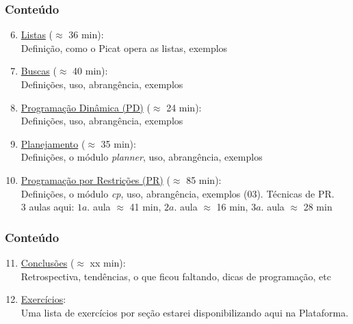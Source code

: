 			
\begin{frame}[fragile]
  \frametitle{Conteúdo}
  
  \begin{enumerate}

   \setcounter{enumi}{5}
    \item  \underline{Listas} ($\approx$ 36 min):\\
    Definição, como o Picat opera as listas, exemplos


    \pause
    \item  \underline{Buscas} ($\approx$ 40 min):\\
    Definições, uso, abrangência, exemplos

    \pause
    \item \underline{Programação Dinâmica (PD)} ($\approx$ 24 min):\\
        Definições, uso, abrangência, exemplos

    
    \pause
    \item \underline{Planejamento} ($\approx$ 35 min):\\
        Definições, o módulo \textit{planner}, uso, abrangência, exemplos

    \pause
		\item \underline{Programação por Restrições (PR)} ($\approx$ 85 min):\\
      Definições, o módulo \textit{cp}, uso, abrangência, exemplos (03).
      Técnicas de PR.\\
      3 aulas aqui: $1a.$ aula $\approx$ 41 min, $2a.$ aula $\approx$ 16 min,
      $3a.$ aula $\approx$ 28 min
      
    
\end{enumerate}

\end{frame}


			
\begin{frame}[fragile]
  \frametitle{Conteúdo}
  
  \begin{enumerate}

   \setcounter{enumi}{10}

		\item  \underline{Conclusões} ($\approx$ xx min):\\
    Retrospectiva, tendências, o que ficou faltando, dicas de programação, etc

    \pause
		\item  \underline{Exercícios}: \\
    Uma lista de exercícios por seção estarei disponibilizando aqui na Plataforma.

    
\end{enumerate}

\end{frame}



